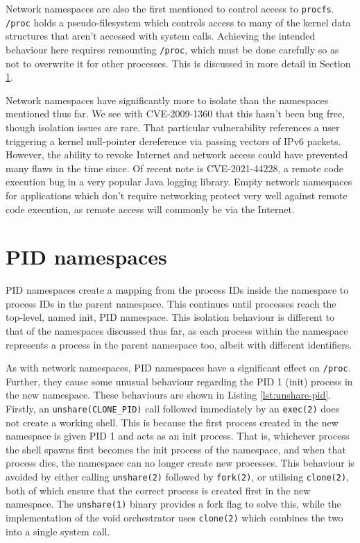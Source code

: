 \documentclass[12pt,a4paper,twoside]{report}
\begin{document}
Network namespaces are also the first mentioned to control access to \texttt{procfs}. \texttt{/proc} holds a pseudo-filesystem which controls access to many of the kernel data structures that aren't accessed with system calls. Achieving the intended behaviour here requires remounting \texttt{/proc}, which must be done carefully so as not to overwrite it for other processes. This is discussed in more detail in Section \ref{sec:voiding-pid}.

Network namespaces have significantly more to isolate than the namespaces mentioned thus far. We see with CVE-2009-1360 that this hasn't been bug free, though isolation issues are rare. That particular vulnerability references a user triggering a kernel null-pointer dereference via passing vectors of IPv6 packets. However, the ability to revoke Internet and network access could have prevented many flaws in the time since. Of recent note is CVE-2021-44228, a remote code execution bug in a very popular Java logging library. Empty network namespaces for applications which don't require networking protect very well against remote code execution, as remote access will commonly be via the Internet.

\section{PID namespaces}
\label{sec:voiding-pid}

PID namespaces create a mapping from the process IDs inside the namespace to process IDs in the parent namespace. This continues until processes reach the top-level, named init, PID namespace. This isolation behaviour is different to that of the namespaces discussed thus far, as each process within the namespace represents a process in the parent namespace too, albeit with different identifiers.

As with network namespaces, PID namespaces have a significant effect on \texttt{/proc}. Further, they cause some unusual behaviour regarding the PID 1 (init) process in the new namespace. These behaviours are shown in Listing \ref{lst:unshare-pid}. Firstly, an \texttt{unshare(CLONE\_PID)} call followed immediately by an \texttt{exec(2)} does not create a working shell. This is because the first process created in the new namespace is given PID 1 and acts as an init process. That is, whichever process the shell spawns first becomes the init process of the namespace, and when that process dies, the namespace can no longer create new processes. This behaviour is avoided by either calling \texttt{unshare(2)} followed by \texttt{fork(2)}, or utilising \texttt{clone(2)}, both of which ensure that the correct process is created first in the new namespace. The \texttt{unshare(1)} binary provides a fork flag to solve this, while the implementation of the void orchestrator uses \texttt{clone(2)} which combines the two into a single system call.
\end{document}
